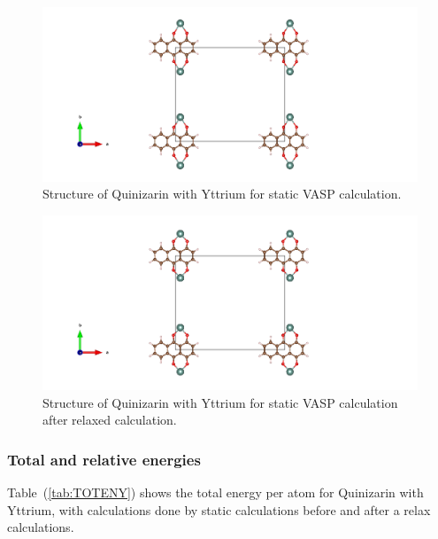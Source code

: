 \documentclass{article}
\begin{document}
      \begin{figure}[H]
        \centering
        \includegraphics[width = \textwidth]{../fig/Y_staticbefore_CONTCAR.png}
        \caption{Structure of Quinizarin with Yttrium for static VASP calculation. }
        \label{fig:Y_staticbefore_CONTCAR}
      \end{figure}

      \begin{figure}[H]
        \centering
        \includegraphics[width = \textwidth]{../fig/Y_staticafter_CONTCAR.png}
        \caption{Structure of Quinizarin with Yttrium for static VASP   calculation after relaxed calculation. }
        \label{fig:Y_staticafter_CONTCAR}
      \end{figure}

      \vspace{1cm}

    \subsubsection{Total and relative energies}

      Table~(\ref{tab:TOTENY}) shows the total energy per atom for Quinizarin with Yttrium, with calculations done by static calculations before and after a relax calculations. \\
\end{document}
